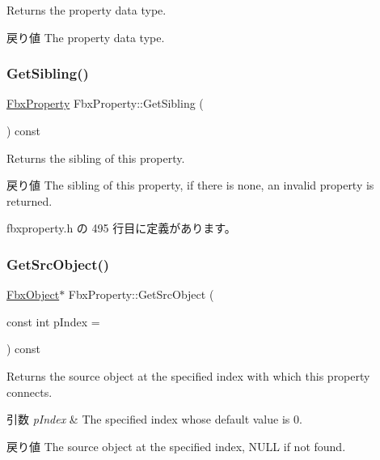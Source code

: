 Returns the property data type. \begin{DoxyReturn}{戻り値}
The property data type. 
\end{DoxyReturn}
\mbox{\label{class_fbx_property_ac723c81393df4b2fdedd78863b361ab5}} 
\subsubsection{\texorpdfstring{Get\+Sibling()}{GetSibling()}}
{\footnotesize\ttfamily \hyperlink{class_fbx_property}{Fbx\+Property} Fbx\+Property\+::\+Get\+Sibling (\begin{DoxyParamCaption}{ }\end{DoxyParamCaption}) const\hspace{0.3cm}{\ttfamily [inline]}}

Returns the sibling of this property. \begin{DoxyReturn}{戻り値}
The sibling of this property, if there is none, an invalid property is returned. 
\end{DoxyReturn}


 fbxproperty.\+h の 495 行目に定義があります。

\mbox{\label{class_fbx_property_ade290835b0d88b978bc2566e255c5974}} 
\subsubsection{\texorpdfstring{Get\+Src\+Object()}{GetSrcObject()}\hspace{0.1cm}{\footnotesize\ttfamily [1/4]}}
{\footnotesize\ttfamily \hyperlink{class_fbx_object}{Fbx\+Object}$\ast$ Fbx\+Property\+::\+Get\+Src\+Object (\begin{DoxyParamCaption}\item[{const int}]{p\+Index = {} }\end{DoxyParamCaption}) const}

Returns the source object at the specified index with which this property connects. 
\begin{DoxyParams}{引数}
{\em p\+Index} & The specified index whose default value is 0. \\
\hline
\end{DoxyParams}
\begin{DoxyReturn}{戻り値}
The source object at the specified index, N\+U\+LL if not found. 
\end{DoxyReturn}
\mbox{\label{class_fbx_property_ab7e0cadde56df774a9a52e24be2bcec9}} 
